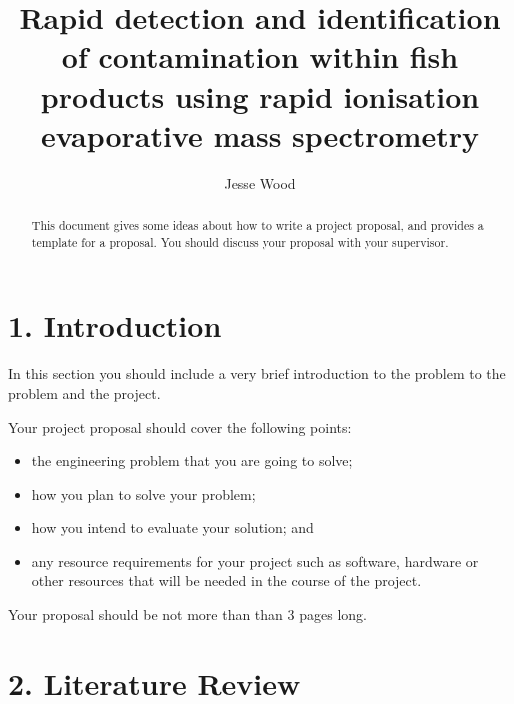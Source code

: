 \documentclass[11pt, a4paper, twoside, openright]{report}
\title{Rapid detection and identification of contamination within fish products using rapid ionisation evaporative mass spectrometry}
\author{Jesse Wood}
\date{}
\begin{document}
\frontmatter


\begin{abstract}
  This document gives some ideas about how to write a project
  proposal, and provides a template for a proposal. You should discuss
  your proposal with your supervisor.
\end{abstract}


\maketitle




\mainmatter


\section*{1. Introduction}

In this section you should include a very brief introduction to the
problem to the problem and the project.

Your project proposal should cover the following points:

\begin{itemize}
\item the engineering problem that you are going to solve;
\item how you plan to solve your problem;
\item how you intend to evaluate your solution; and
\item any resource requirements for your project such as software,
  hardware or other resources that will be needed in the course of the
  project.
\end{itemize}

Your proposal should be not more than than 3 pages long.

\section*{2. Literature Review}
\end{document}
